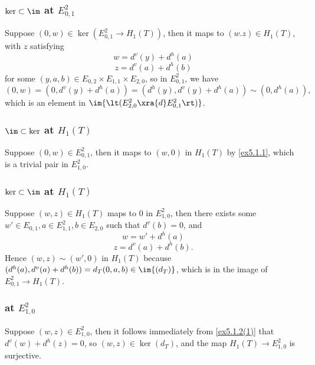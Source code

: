\subsubsection*{\texorpdfstring{$\ker\subset\im$}{ker⊂im} \texorpdfstring{\textbf{at}}{at} \texorpdfstring{$E^2_{0,1}$}{E²₀₁}}
Suppose $(0,w)\in\ker{(E^2_{0,1}\to H_1(T))}$, then it maps to $(w.z)\in H_1(T)$, with $z$ satisfying
\[w=d^v(y)+d^h(a)\]
\[z=d^v(a)+d^h(b)\]
for some $(y,a,b)\in E_{0,2}\times E_{1,1}\times E_{2,0}$, so in $E^2_{0,1}$, we have
\[(0,w)=(0,d^v(y)+d^h(a))=(d^h(y),d^v(y)+d^h(a))\sim(0,d^h(a)),\]
which is an element in $\im{\lt(E^2_{2,0}\xra{d}E^2_{0,1}\rt)}$.
\subsubsection*{\texorpdfstring{$\im\subset\ker$}{im⊂ker} \texorpdfstring{\textbf{at}}{at} \texorpdfstring{$H_1(T)$}{H₁T}}
Suppose $(0,w)\in E^2_{0,1}$, then it maps to $(w,0)$ in $H_1(T)$ by \ref{ex5.1.1}, which is a trivial pair in $E^2_{1,0}$.
\subsubsection*{\texorpdfstring{$\ker\subset\im$}{ker⊂im} \texorpdfstring{\textbf{at}}{at} \texorpdfstring{$H_1(T)$}{H₁T}}
Suppose $(w,z)\in H_1(T)$ maps to 0 in $E^2_{1,0}$, then there exists some $w'\in E_{0,1},a\in E^2_{1,1},b\in E_{2,0}$ such that $d^v(b)=0$, and
\[w=w'+d^h(a)\]
\[z=d^v(a)+d^h(b).\]
Hence $(w,z)\sim(w',0)$ in $H_1(T)$ because $(d^h(a),d^v(a)+d^h(b))=d_T(0,a,b)\in\im{(d_T)}$, which is in the image of $E^2_{0,1}\to H_1(T)$.
\subsubsection*{\texorpdfstring{\textbf{at}}{at} \texorpdfstring{$E^2_{1,0}$}{E²₁₀}}
Suppose $(w,z)\in E^2_{1,0}$, then it follows immediately from \ref{ex5.1.2(1)} that $d^v(w)+d^h(z)=0$, so $(w,z)\in\ker{(d_T)}$, and the map $H_1(T)\to E^2_{1,0}$ is surjective.